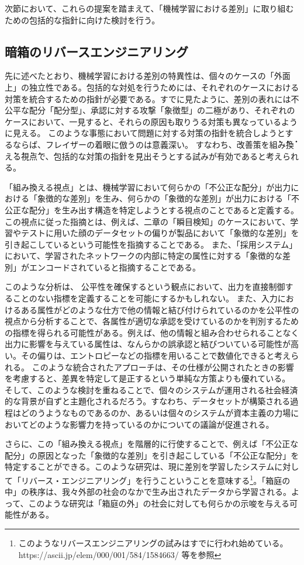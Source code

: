\documentclass[b5j,twoside,twocolumn]{utarticle}
\begin{document}
次節において、これらの提案を踏まえて、「機械学習における差別」に取り組むための包括的な指針に向けた検討を行う。

\subsection{暗箱のリバースエンジニアリング}
先に述べたとおり、機械学習における差別の特異性は、個々のケースの「外面上」の独立性である。包括的な対処を行うためには、それぞれのケースにおける対策を統合するための指針が必要である。すでに見たように、差別の表れには不公平な配分「配分型」、承認に対する攻撃「象徴型」の二極があり、それぞれのケースにおいて、一見すると、それらの原因も取りうる対策も異なっているように見える。
このような事態において問題に対する対策の指針を統合しようとするならば、フレイザーの着眼に倣うのは意義深い。
すなわち、改善策を\.組\.み\.換\.え\.る\.視\.点で、包括的な対策の指針を見出そうとする試みが有効であると考えられる。


「組み換える視点」とは、機械学習において何らかの「不公正な配分」が出力における「象徴的な差別」を生み、何らかの「象徴的な差別」が出力における「不公正な配分」を生み出す構造を特定しようとする視点のことであると定義する。この視点に従った指摘とは、例えば、二章の「瞬目検知」のケースにおいて、学習やテストに用いた顔のデータセットの偏りが製品において「象徴的な差別」を引き起こしているという可能性を指摘することである。
また、「採用システム」において、学習されたネットワークの内部に特定の属性に対する「象徴的な差別」がエンコードされていると指摘することである。


このような分析は、
公平性を確保するという観点において、出力を直接制御することのない指標を定義することを可能にするかもしれない。
また、入力におけるある属性がどのような仕方で他の情報と結び付けられているのかを公平性の視点から分析することで、各属性が適切な承認を受けているのかを判別するための指標を得られる可能性がある。例えば、他の情報と組み合わせられることなく出力に影響を与えている属性は、なんらかの誤承認と結びついている可能性が高い。その偏りは、エントロピーなどの指標を用いることで数値化できると考えられる。
このような統合されたアプローチは、その仕様が公開されたときの影響を考慮すると、差異を特定して是正するという単純な方策よりも優れている。
そして、このような検討を重ねることで、個々のシステムが運用される社会経済的な背景が自ずと主題化されるだろう。すなわち、データセットが構築される過程はどのうようなものであるのか、あるいは個々のシステムが資本主義の力場においてどのような影響力を持っているのかについての議論が促進される。


さらに、この「組み換える視点」を階層的に行使することで、例えば「不公正な配分」の原因となった「象徴的な差別」を引き起こしている「不公正な配分」を特定することができる。このような研究は、現に差別を学習したシステムに対して「リバース・エンジニアリング」を行うこということを意味する\footnote{このようなリバースエンジニアリングの試みはすでに行われ始めている。\cite{Tan_2018} https://ascii.jp/elem/000/001/584/1584663/ 等を参照}。「箱庭の中」の秩序は、我々外部の社会のなかで生み出されたデータから学習される。よって、このような研究は「箱庭の外」の社会に対しても何らかの示唆を与える可能性がある。
\end{document}
